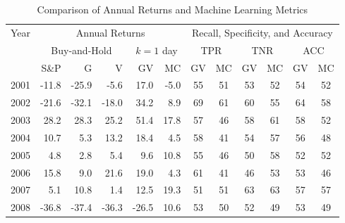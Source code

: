 \documentclass{article}
\begin{document}
\newpage
\begin{table}[!ht]
    \centering
    \caption{Comparison of Annual Returns and Machine Learning Metrics}
    \medskip
    \begin{tabular}{l || rrr || rr || cc||cc||cc}
    \hline
    \multirow{3}{*}{Year} & \multicolumn{5}{c||}{Annual Returns} & \multicolumn{6}{c}{Recall, Specificity, and Accuracy}  \\
    \cline{2-12}
    & \multicolumn{3}{c||}{Buy-and-Hold}   
& \multicolumn{2}{c||}{$k=1$  day} 
& \multicolumn{2}{c}{TPR}  & \multicolumn{2}{c}{TNR}  & \multicolumn{2}{c}{ACC}  \\ \cline{2-12}
 & S\&P & G & V  & GV  & MC  & GV & MC  & GV  & MC & GV & MC \\ \hline
        2001 & -11.8 & \cellcolor{red!25}-25.9 & \cellcolor{green!25}-5.6 & \cellcolor{green!25}17.0 & -5.0 & \cellcolor{green!25}55 & 51 & \cellcolor{green!25}53 & 52 & \cellcolor{green!25}54 & 52 \\ 
        2002 & -21.6 & \cellcolor{red!25}-32.1 & \cellcolor{green!25}-18.0 & \cellcolor{green!25}34.2 & 8.9 & \cellcolor{green!25}69 & 61 & \cellcolor{green!25}60 & 55 & \cellcolor{green!25}64 & 58 \\ 
        2003 & 28.2 & \cellcolor{green!25}28.3 & \cellcolor{red!25}25.2 & \cellcolor{green!25}51.4 & 17.8 & \cellcolor{green!25}57 & 46 & 58 & \cellcolor{green!25}61 & \cellcolor{green!25}58 & 52 \\ 
        2004 & 10.7 & \cellcolor{red!25}5.3 & \cellcolor{green!25}13.2 & \cellcolor{green!25}18.4 & 4.5 & \cellcolor{green!25}58 & 41 & 54 & \cellcolor{green!25}57 & \cellcolor{green!25}56 & 48 \\ 
        2005 & 4.8 & \cellcolor{red!25}2.8 & \cellcolor{green!25}5.4 & 9.6 & \cellcolor{green!25}10.8 & \cellcolor{green!25}55 & 46 & 50 & \cellcolor{green!25}58 & \cellcolor{green!25}52 & \cellcolor{green!25}52 \\ 
        2006 & 15.8 & \cellcolor{red!25}9.0 & \cellcolor{green!25}21.6 & \cellcolor{green!25}19.0 & 4.3 & \cellcolor{green!25}61 & 41 & 46 & \cellcolor{green!25}53 & \cellcolor{green!25}53 & 46 \\ 
        2007 & 5.1 & \cellcolor{green!25}10.8 & \cellcolor{red!25}1.4 & 12.5 & \cellcolor{green!25}19.3 & \cellcolor{green!25}51 & \cellcolor{green!25}51 & \cellcolor{green!25}63 & \cellcolor{green!25}63 & \cellcolor{green!25}57 & \cellcolor{green!25}57 \\ 
        2008 & -36.8 & \cellcolor{red!25}-37.4 & \cellcolor{green!25}-36.3 & -26.5 & \cellcolor{green!25}10.6 & \cellcolor{green!25}53 & 50 & \cellcolor{green!25}52 & 49 & \cellcolor{green!25}53 & 49 \\ 

\end{tabular}
\end{table}
\end{document}
